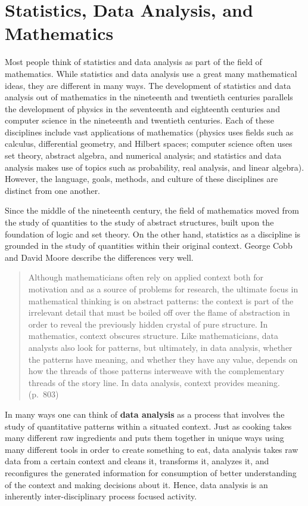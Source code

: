 \documentclass[
]{book}
\let\stdsection\section
\renewcommand\section{\newpage\stdsection}
\theoremstyle{definition}
\theoremstyle{definition}
\theoremstyle{definition}
\theoremstyle{definition}
\theoremstyle{remark}
\begin{document}
\hypertarget{statistics-data-analysis-and-mathematics}{%
\section{Statistics, Data Analysis, and Mathematics}\label{statistics-data-analysis-and-mathematics}}

Most people think of statistics and data analysis as part of the field of mathematics. While statistics and data analysis use a great many mathematical ideas, they are different in many ways. The development of statistics and data analysis out of mathematics in the nineteenth and twentieth centuries parallels the development of physics in the seventeenth and eighteenth centuries and computer science in the nineteenth and twentieth centuries. Each of these disciplines include vast applications of mathematics (physics uses fields such as calculus, differential geometry, and Hilbert spaces; computer science often uses set theory, abstract algebra, and numerical analysis; and statistics and data analysis makes use of topics such as probability, real analysis, and linear algebra). However, the language, goals, methods, and culture of these disciplines are distinct from one another.

Since the middle of the nineteenth century, the field of mathematics moved from the study of quantities to the study of abstract structures, built upon the foundation of logic and set theory. On the other hand, statistics as a discipline is grounded in the study of quantities within their original context. George Cobb and David Moore \citeyearpar{Cobb1997} describe the differences very well.

\begin{quote}
Although mathematicians often rely on applied context both for motivation and as a source of problems for research, the ultimate focus in mathematical thinking is on abstract patterns: the context is part of the irrelevant detail that must be boiled off over the flame of abstraction in order to reveal the previously hidden crystal of pure structure. In mathematics, context obscures structure. Like mathematicians, data analysts also look for patterns, but ultimately, in data analysis, whether the patterns have meaning, and whether they have any value, depends on how the threads of those patterns interweave with the complementary threads of the story line. In data analysis, context provides meaning. (p.~803)
\end{quote}

In many ways one can think of \textbf{data analysis} as a process that involves the study of quantitative patterns within a situated context. Just as cooking takes many different raw ingredients and puts them together in unique ways using many different tools in order to create something to eat, data analysis takes raw data from a certain context and cleans it, transforms it, analyzes it, and reconfigures the generated information for consumption of better understanding of the context and making decisions about it. Hence, data analysis is an inherently inter-disciplinary process focused activity.
\end{document}
